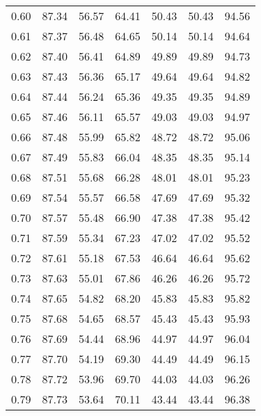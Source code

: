 \begin{tabular}{|c|c|c|c|c|c|c|}
      0.60 &     87.34 &     56.57 &      64.41 &   50.43 &      50.43 &         94.56 \\
      0.61 &     87.37 &     56.48 &      64.65 &   50.14 &      50.14 &         94.64 \\
      0.62 &     87.40 &     56.41 &      64.89 &   49.89 &      49.89 &         94.73 \\
      0.63 &     87.43 &     56.36 &      65.17 &   49.64 &      49.64 &         94.82 \\
      0.64 &     87.44 &     56.24 &      65.36 &   49.35 &      49.35 &         94.89 \\
      0.65 &     87.46 &     56.11 &      65.57 &   49.03 &      49.03 &         94.97 \\
      0.66 &     87.48 &     55.99 &      65.82 &   48.72 &      48.72 &         95.06 \\
      0.67 &     87.49 &     55.83 &      66.04 &   48.35 &      48.35 &         95.14 \\
      0.68 &     87.51 &     55.68 &      66.28 &   48.01 &      48.01 &         95.23 \\
      0.69 &     87.54 &     55.57 &      66.58 &   47.69 &      47.69 &         95.32 \\
      0.70 &     87.57 &     55.48 &      66.90 &   47.38 &      47.38 &         95.42 \\
      0.71 &     87.59 &     55.34 &      67.23 &   47.02 &      47.02 &         95.52 \\
      0.72 &     87.61 &     55.18 &      67.53 &   46.64 &      46.64 &         95.62 \\
      0.73 &     87.63 &     55.01 &      67.86 &   46.26 &      46.26 &         95.72 \\
      0.74 &     87.65 &     54.82 &      68.20 &   45.83 &      45.83 &         95.82 \\
      0.75 &     87.68 &     54.65 &      68.57 &   45.43 &      45.43 &         95.93 \\
      0.76 &     87.69 &     54.44 &      68.96 &   44.97 &      44.97 &         96.04 \\
      0.77 &     87.70 &     54.19 &      69.30 &   44.49 &      44.49 &         96.15 \\
      0.78 &     87.72 &     53.96 &      69.70 &   44.03 &      44.03 &         96.26 \\
      0.79 &     87.73 &     53.64 &      70.11 &   43.44 &      43.44 &         96.38 \\

\end{tabular}
